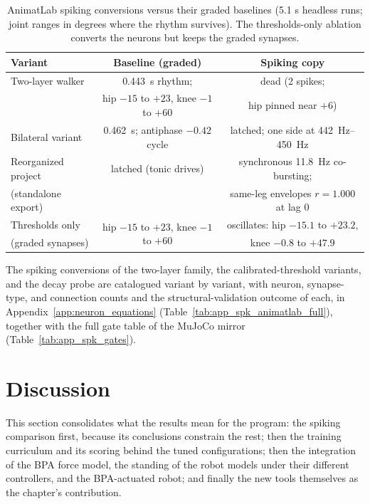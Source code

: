 \begin{table}[htbp]
\caption{AnimatLab spiking conversions versus their graded baselines (5.1 s headless runs; joint ranges in degrees where the rhythm survives). The thresholds-only ablation converts the neurons but keeps the graded synapses.}
\label{tab:spike_animatlab}
\begin{tabular}{@{}lcc@{}}
\toprule
\textbf{Variant} & \textbf{Baseline (graded)} & \textbf{Spiking copy} \\
\midrule
Two-layer walker     & \qty{0.443}{\second} rhythm;   & dead (2 spikes; \\
                     & hip $-15$ to $+23$, knee $-1$ to $+60$ & hip pinned near $+6$) \\
Bilateral variant    & \qty{0.462}{\second}; antiphase $-0.42$ cycle & latched; one side at \qty{442}{\hertz}--\qty{450}{\hertz} \\
Reorganized project  & latched (tonic drives) & synchronous \qty{11.8}{\hertz} co-bursting; \\
(standalone export)  &                        & same-leg envelopes $r = 1.000$ at lag 0 \\
Thresholds only      & \multirow{2}{*}{hip $-15$ to $+23$, knee $-1$ to $+60$} & oscillates: hip $-15.1$ to $+23.2$, \\
(graded synapses)    &                        & knee $-0.8$ to $+47.9$ \\
\bottomrule
\end{tabular}
\end{table}

The spiking conversions of the two-layer family, the calibrated-threshold variants, and the decay probe are catalogued variant by variant, with neuron, synapse-type, and connection counts and the structural-validation outcome of each, in Appendix~\ref{app:neuron_equations} (Table~\ref{tab:app_spk_animatlab_full}), together with the full gate table of the MuJoCo mirror (Table~\ref{tab:app_spk_gates}).

\section{Discussion}\label{sec:sns_discussion}

This section consolidates what the results mean for the program: the spiking comparison first, because its conclusions constrain the rest; then the training curriculum and its scoring behind the tuned configurations; then the integration of the BPA force model, the standing of the robot models under their different controllers, and the BPA-actuated robot; and finally the new tools themselves as the chapter's contribution.

